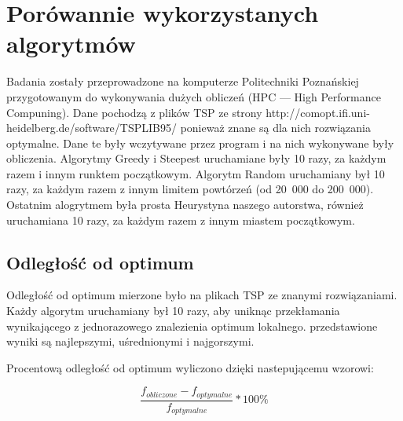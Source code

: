 \section{Porówannie wykorzystanych algorytmów}

Badania zostały przeprowadzone na komputerze Politechniki Poznańskiej przygotowanym do 
wykonywania dużych obliczeń (HPC --- High Performance Compuning). Dane pochodzą z plików
TSP ze strony http://comopt.ifi.uni-heidelberg.de/software/TSPLIB95/ ponieważ znane są dla
nich rozwiązania optymalne. Dane te były wczytywane przez program i na nich wykonywane były 
obliczenia. Algorytmy Greedy i Steepest uruchamiane były 10 razy, za każdym razem i innym 
runktem początkowym. Algorytm Random uruchamiany był 10 razy, za każdym razem z innym 
limitem powtórzeń (od 20~000 do 200~000). Ostatnim alogrytmem była prosta Heurystyna naszego
autorstwa, również uruchamiana 10 razy, za każdym razem z innym miastem początkowym.

\subsection{Odległość od optimum}

Odległość od optimum mierzone było na plikach TSP ze znanymi rozwiązaniami. Każdy algorytm 
uruchamiany był 10 razy, aby uniknąc przekłamania wynikającego z jednorazowego znalezienia 
optimum lokalnego. przedstawione wyniki są najlepszymi, uśrednionymi i najgorszymi.

Procentową odległość od optimum wyliczono dzięki nastepującemu wzorowi:

$$ \frac{f_{obliczone} - f_{optymalne}}{f_{optymalne}} * 100 \% $$

